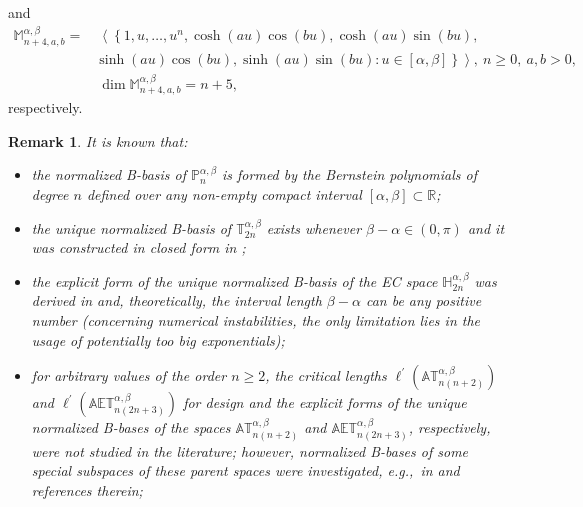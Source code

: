 \documentclass[b5paper, twosided]{book}
\newtheorem{remark}{Remark}[chapter]
\begin{document}
and
\begin{align}
\mathbb{M}_{n+4,a,b}^{\alpha,\beta}=&~
\left\langle
\left\{1,u,\ldots,u^n,
\cosh\left(au\right)\cos\left(bu\right),\cosh\left(au\right)\sin\left(bu\right),\right.\right.
\label{eq:Mazure_vector_space}
\\
&
\left.\left.\sinh\left(au\right)\cos\left(bu\right),\sinh\left(au\right)\sin\left(bu\right)
:
u \in \left[\alpha,\beta\right]
\right\}
\right\rangle,
~
n \geq 0,~a,b>0,
\\
&
~
\dim\mathbb{M}_{n+4,a,b}^{\alpha,\beta}=n+5,
\nonumber{}
\end{align}
respectively.
\begin{remark}It is known that:
    \begin{itemize}
        \item
        the normalized B-basis of $\mathbb{P}_{n}^{\alpha,\beta}$ is formed by the Bernstein polynomials \citep{Carnicer1993} of degree $n$ defined over any non-empty compact interval $\left[\alpha,\beta\right]\subset \mathbb{R}$;
        
        \item
        the unique normalized B-basis of $\mathbb{T}_{2n}^{\alpha,\beta}$ exists whenever $\beta-\alpha \in \left(0,\pi\right)$ and it was constructed in closed form in \citep{Sanchez1998};
        
        \item
        the explicit form of the unique normalized B-basis of the EC space $\mathbb{H}_{2n}^{\alpha,\beta}$ was derived in \citep{ShenWang2005} and, theoretically, the interval length $\beta-\alpha$ can be any positive number (concerning numerical instabilities, the only limitation lies in the usage of potentially too big exponentials);
        
        \item
        for arbitrary values of the order $n \geq 2$, the critical lengths $\ell^{\prime}\left(\mathbb{AT}_{n\left(n+2\right)}^{\alpha,\beta}\right)$ and $ \ell^{\prime}\left(\mathbb{AET}_{n\left(2n+3\right)}^{\alpha,\beta}\right)$ for design and the explicit forms of the unique normalized B-bases of the spaces $\mathbb{AT}_{n\left(n+2\right)}^{\alpha,\beta}$ and  $\mathbb{AET}_{n\left(2n+3\right)}^{\alpha,\beta}$, respectively, were not studied in the literature;  however, normalized B-bases of some special subspaces of these parent spaces were investigated, e.g.,\ in \citep{MainarPena2004,CarnicerMainarPena2004,CarnicerMainarPena2007, MainarPena2010, CarnicerMainarPena2014} and references therein;
    

\end{itemize}
\end{remark}
\end{document}
